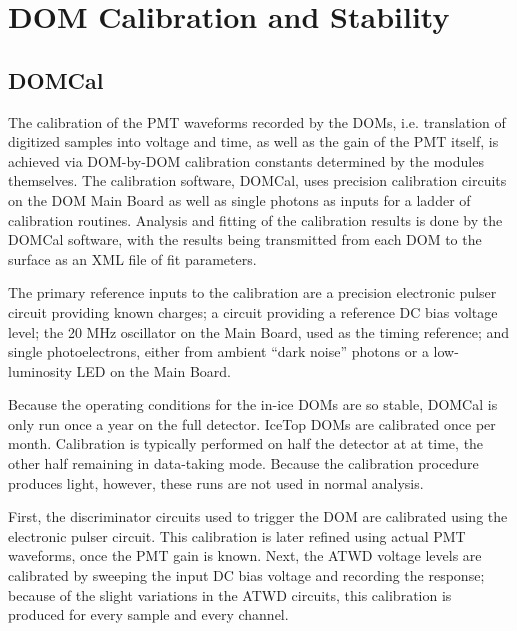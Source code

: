 \section{\label{sec:dom_calibration} DOM Calibration and Stability}


\subsection{\label{sec:domcal} DOMCal}

The calibration of the PMT waveforms recorded by the DOMs, i.e. translation
of digitized samples into voltage and time, as well as the gain of the PMT
itself, is achieved via DOM-by-DOM calibration constants determined by the
modules themselves.  The calibration software, DOMCal, uses precision calibration
circuits on the DOM Main Board as well as single photons as inputs
for a ladder of calibration routines.  Analysis and fitting of the
calibration results is done by the DOMCal software, with the results being
transmitted from each DOM to the surface as an XML file of fit parameters.

The primary reference inputs to the calibration are a precision electronic
pulser circuit providing known charges; a circuit providing a reference DC
bias voltage level; the 20 MHz oscillator on the Main
Board, used as the timing reference; and single photoelectrons, either from
ambient ``dark noise'' photons or a low-luminosity LED on the Main Board.

Because the operating conditions for
the in-ice DOMs are so stable, DOMCal is only run once a year on the full
detector. IceTop DOMs are calibrated once per month.  Calibration is
typically performed on half the detector at at time, the other half
remaining in data-taking mode.  Because the calibration procedure produces
light, however, these runs are not used in normal analysis.


First, the discriminator circuits used to trigger the DOM are calibrated
using the electronic pulser circuit.  This calibration is later refined using actual
PMT waveforms, once the PMT gain is known.  Next, the ATWD voltage levels
are calibrated by sweeping the input DC bias voltage and recording the
response; because of the slight variations in the ATWD circuits, this
calibration is produced for every sample and every channel.

